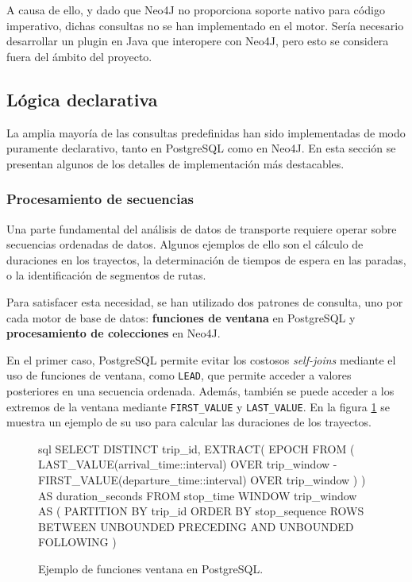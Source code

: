 A causa de ello, y dado que Neo4J no proporciona soporte nativo para código imperativo, dichas consultas no se han implementado en el motor. Sería necesario desarrollar un plugin en Java que interopere con Neo4J, pero esto se considera fuera del ámbito del proyecto.

\subsection{Lógica declarativa}

La amplia mayoría de las consultas predefinidas han sido implementadas de modo puramente declarativo, tanto en PostgreSQL como en Neo4J. En esta sección se presentan algunos de los detalles de implementación más destacables.

\subsubsection{Procesamiento de secuencias}

Una parte fundamental del análisis de datos de transporte requiere operar sobre secuencias ordenadas de datos. Algunos ejemplos de ello son el cálculo de duraciones en los trayectos, la determinación de tiempos de espera en las paradas, o la identificación de segmentos de rutas.

Para satisfacer esta necesidad, se han utilizado dos patrones de consulta, uno por cada motor de base de datos: \textbf{funciones de ventana} en PostgreSQL y \textbf{procesamiento de colecciones} en Neo4J.

En el primer caso, PostgreSQL permite evitar los costosos \textit{self-joins} mediante el uso de funciones de ventana, como \texttt{LEAD}, que permite acceder a valores posteriores en una secuencia ordenada. Además, también se puede acceder a los extremos de la ventana mediante \texttt{FIRST\_VALUE} y \texttt{LAST\_VALUE}. En la figura \ref{design:window_functions} se muestra un ejemplo de su uso para calcular las duraciones de los trayectos.

\begin{figure}[ht]
    \centering
    \begin{huggedminted}{sql}
SELECT DISTINCT
    trip_id,
    EXTRACT(
        EPOCH FROM (
            LAST_VALUE(arrival_time::interval) OVER trip_window -
            FIRST_VALUE(departure_time::interval) OVER trip_window
        )
    ) AS duration_seconds
FROM stop_time
WINDOW trip_window AS (
    PARTITION BY trip_id
    ORDER BY stop_sequence
    ROWS BETWEEN UNBOUNDED PRECEDING AND UNBOUNDED FOLLOWING
)
    \end{huggedminted}
    \caption{Ejemplo de funciones ventana en PostgreSQL.}
    \label{design:window_functions}
\end{figure}

